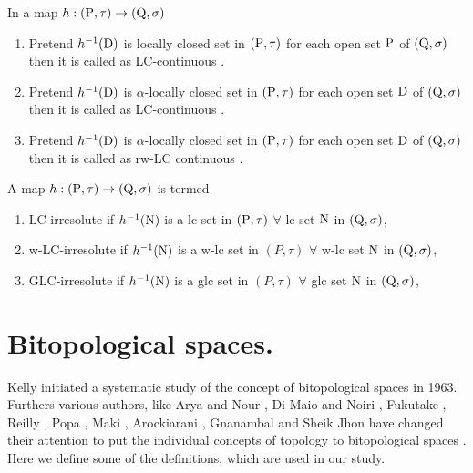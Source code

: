 \begin{dfn}\label{dfn1.5.2} 
In a map $h: (\mathrm{P}, \tau) \rightarrow (\mathrm{Q}, \sigma)$ 
\begin{enumerate}[\rm (i)]
\item Pretend $h^{-1}(\mathrm{D})$ is locally closed set in $(\mathrm{P}, \tau)$ for each open set $\mathrm{P}$ of $(\mathrm{Q}, \sigma)$ then it is called as LC-continuous \cite{key5} .
\item Pretend $h^{-1}(\mathrm{D})$ is $\alpha$-locally closed set in $(\mathrm{P}, \tau)$ for each open set $\mathrm{D}$ of $(\mathrm{Q}, \sigma)$ then it is called as LC-continuous \cite{key2} .
\item Pretend $h^{-1}(\mathrm{D})$ is $\alpha$-locally closed set in $(\mathrm{P},\tau)$ for each open set $\mathrm{D}$ of $(\mathrm{Q}, \sigma)$ then it is called as rw-LC continuous \cite{key3} .
\end{enumerate}
\end{dfn}

\begin{dfn}\label{dfn1.5.3} 
A map $h: (\mathrm{P}, \tau)\rightarrow (\mathrm{Q}, \sigma)$ is termed
\begin{enumerate}[\rm (i)]
\item LC-irresolute \cite{key37} if $h^{-1}(\mathrm{N})$ is a lc set in $(\mathrm{P},\tau)$ $\forall$ lc-set $\mathrm{N}$ in $(\mathrm{Q}, \sigma)$,
\item w-LC-irresolute \cite{key83} if $h^{-1}(\mathrm{N})$ is a w-lc set in $(P,\tau)$ $\forall$ w-lc set $\mathrm{N}$ in $(\mathrm{Q}, \sigma)$,
\item GLC-irresolute \cite{key12} if $h^{-1}(\mathrm{N})$ is a glc set in $(P,\tau)$ $\forall$ glc set $\mathrm{N}$ in $(\mathrm{Q}, \sigma)$,
\end{enumerate}
\end{dfn}

\section{Bitopological spaces.}

Kelly \cite{key45} initiated a systematic study of the concept of bitopological spaces in 1963. Furthers various authors, like Arya and Nour \cite{key7}, Di Maio and Noiri \cite{key24}, Fukutake \cite{key34}, Reilly \cite{key81}, Popa \cite{key78}, Maki \cite{key55}, Arockiarani \cite{key3}, Gnanambal \cite{key40} and Sheik Jhon \cite{key83} have changed their attention to put the individual concepts of topology to bitopological spaces . Here we define some of the definitions, which are used in our study. 

